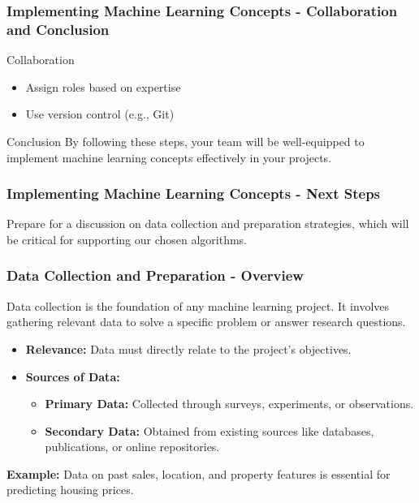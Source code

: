 \documentclass{beamer}
\begin{document}
\begin{frame}[fragile]
    \frametitle{Implementing Machine Learning Concepts - Collaboration and Conclusion}
    \begin{block}{Collaboration}
        \begin{itemize}
            \item Assign roles based on expertise
            \item Use version control (e.g., Git)
        \end{itemize}
    \end{block}
    \begin{block}{Conclusion}
        By following these steps, your team will be well-equipped to implement machine learning concepts effectively in your projects.
    \end{block}
\end{frame}

\begin{frame}[fragile]
    \frametitle{Implementing Machine Learning Concepts - Next Steps}
    Prepare for a discussion on data collection and preparation strategies, which will be critical for supporting our chosen algorithms.
\end{frame}

\begin{frame}[fragile]
    \frametitle{Data Collection and Preparation - Overview}
    Data collection is the foundation of any machine learning project. It involves gathering relevant data to solve a specific problem or answer research questions.
    \begin{itemize}
        \item \textbf{Relevance:} Data must directly relate to the project's objectives.
        \item \textbf{Sources of Data:}
        \begin{itemize}
            \item \textbf{Primary Data:} Collected through surveys, experiments, or observations.
            \item \textbf{Secondary Data:} Obtained from existing sources like databases, publications, or online repositories.
        \end{itemize}
    \end{itemize}
    \textbf{Example:} Data on past sales, location, and property features is essential for predicting housing prices.
\end{frame}
\end{document}
